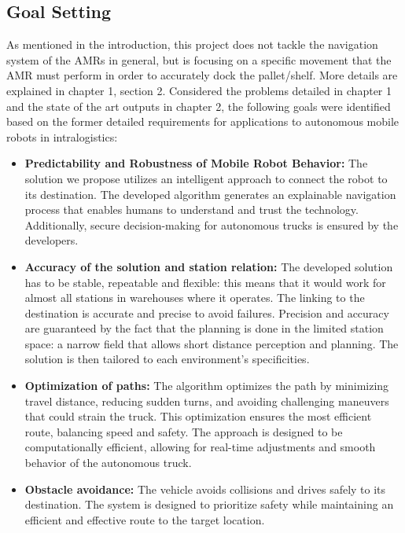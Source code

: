 \subsection{Goal Setting}
As mentioned in the introduction, this project does not tackle the navigation system of the AMRs in 
general, but is focusing on a specific movement that the AMR must perform in order to accurately dock the pallet/shelf. 
More details are explained in chapter 1, section 2.
Considered the problems detailed in chapter 1 and the state of the art outputs in chapter 2, 
the following goals were identified 
based on the former detailed requirements for applications to autonomous mobile robots in intralogistics:
\begin{itemize}
    \item \textbf{Predictability and Robustness of Mobile Robot Behavior: }The solution we propose utilizes an intelligent approach to connect 
    the robot to its destination. The developed algorithm generates an explainable navigation process that enables humans 
    to understand and trust the technology. Additionally, secure decision-making for autonomous trucks is ensured by the 
    developers. 

    \item \textbf{Accuracy of the solution and station relation: }The developed solution has to be stable, repeatable and flexible: this 
    means that it would work for almost all stations in warehouses where it operates. The linking to the destination is 
    accurate and precise to avoid failures. Precision and accuracy are guaranteed by the fact that the planning is done 
    in the limited station space: a narrow field that allows short distance perception and planning. The solution is 
    then tailored to each environment's specificities. 
    
    \item \textbf{Optimization of paths: }The algorithm optimizes the path by minimizing travel distance, reducing sudden turns, and avoiding challenging maneuvers that could 
    strain the truck. This optimization ensures the most efficient route, balancing speed and safety. The approach is designed to be 
    computationally efficient, allowing for real-time adjustments and smooth behavior of the autonomous truck.

    \item \textbf{Obstacle avoidance: }The vehicle avoids collisions and drives safely to its destination. The system is designed to 
    prioritize safety while maintaining an efficient and effective route to the target location.

\end{itemize}


